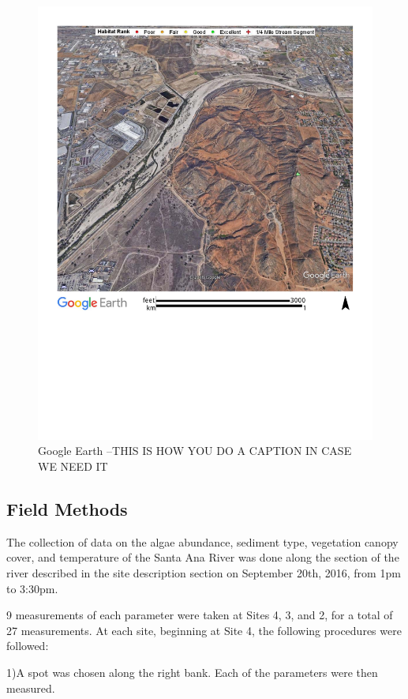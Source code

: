 \documentclass{article}\usepackage[]{graphicx}\usepackage[]{color}
\begin{document}
\begin{figure}
\includegraphics[width=1.00\textwidth]{Figures/SantaAna_SatelliteImage}
\caption{Google Earth --THIS IS HOW YOU DO A CAPTION IN CASE WE NEED IT}
\label{SAR_Image}
\end{figure}

\subsection{Field Methods}
The collection of data on the algae abundance, sediment type, vegetation canopy cover, 
and temperature of the Santa Ana River was done along the section of the river described
in the site description section on September 20th, 2016, from 1pm to 3:30pm.

9 measurements of each parameter were taken at Sites 4, 3, and 2, for a total of 27 measurements. 
At each site, beginning at Site 4, the following procedures were followed: 

1)A spot was chosen along the right bank. Each of the parameters were then measured.
\end{document}
